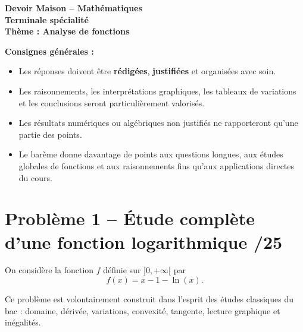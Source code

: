 \documentclass[11pt,a4paper]{article}
\begin{document}
\begin{center}
    {\LARGE \textbf{Devoir Maison -- Mathématiques}}\\[0.3em]
    {\Large \textbf{Terminale spécialité}}\\[0.5em]
    {\large \textbf{Thème : Analyse de fonctions}}\\[0.8em]
\end{center}

\vspace{0.5em}

\noindent\textbf{Consignes générales :}
\begin{itemize}
    \item Les réponses doivent être \textbf{rédigées}, \textbf{justifiées} et organisées avec soin.
    \item Les raisonnements, les interprétations graphiques, les tableaux de variations et les conclusions seront particulièrement valorisés.
    \item Les résultats numériques ou algébriques non justifiés ne rapporteront qu'une partie des points.
    \item Le barème donne davantage de points aux questions longues, aux études globales de fonctions et aux raisonnements fins qu'aux applications directes du cours.
\end{itemize}

\vspace{0.8em}

\begin{center}
\end{center}

\section*{Problème 1 -- Étude complète d'une fonction logarithmique \hfill /25}

On considère la fonction \(f\) définie sur \(]0,+\infty[\) par
\[
f(x)=x-1-\ln(x).
\]

Ce problème est volontairement construit dans l'esprit des études classiques du bac : domaine, dérivée, variations, convexité, tangente, lecture graphique et inégalités.
\end{document}
